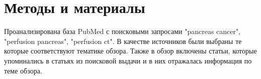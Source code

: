 \section{Методы и материалы}
Проанализирована база PubMed с поисковыми запросами "pancreas cancer", "perfusion pancreas", "perfusion ct". В качестве источников были выбраны те которые соответствуют тематике обзора. Также в обзор включены статьи, которые упоминались в статьях из поисковой выдачи и в них отражалась информация по теме обзора.

